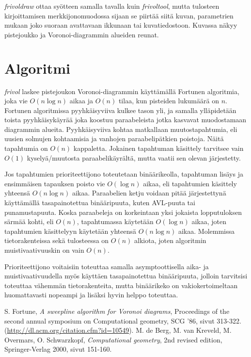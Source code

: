 \documentclass[a4paper, 11pt, finnish]{article}
\begin{document}
\emph{frivoldraw} ottaa syötteen samalla tavalla kuin \emph{frivoltool}, mutta tulosteen kirjoittamisen merkkijonomuodossa sijaan se piirtää siitä kuvan, parametrien mukaan joko suoraan avattavaan ikkunaan tai kuvatiedostoon. Kuvassa näkyy pistejoukko ja Voronoi-diagrammin alueiden reunat.

\section*{Algoritmi}
\emph{frivol} laskee pistejoukon Voronoi-diagrammin käyttämällä Fortunen algoritmia, joka vie $O(n \log n)$ aikaa ja $O(n)$ tilaa, kun pisteiden lukumäärä on $n$. Fortunen algoritmissa pyyhkäisyviiva kulkee tason yli, ja samalla ylläpidetään toista pyyhkäisykäyrää joka koostuu paraabeleista jotka kasvavat muodostamaan diagrammin alueita. Pyyhkäisyviiva kohtaa matkallaan muutostapahtumia, eli uusien solmujen kohtaamisia ja vanhojen paraabelipätkien poistoja. Näitä tapahtumia on $O(n)$ kappaletta. Jokainen tapahtuman käsittely tarvitsee vain $O(1)$ kyselyä/muutosta paraabelikäyrältä, mutta vaatii sen olevan järjestetty.\cite{fortunepaperi}\cite{compgeomkirja}

Jos tapahtumien prioriteettijono toteutetaan binäärikeolla, tapahtuman lisäys ja ensimmäisen tapauksen poisto vie $O(\log n)$ aikaa, eli tapahtumien käsittely yhteensä $O(n \log n)$ aikaa. Paraabelien ketju voidaan pitää järjestettynä käyttämällä tasapainotettua binääripuuta, kuten AVL-puuta tai punamustapuuta. Koska paraabeleja on korkeintaan yksi jokaista lopputuloksen särmää kohti, eli $O(n)$, tapahtumassa käytetään $O(\log n)$ aikaa, joten tapahtumien käsittelyyn käytetään yhteensä $O(n \log n)$ aikaa. Molemmissa tietorakenteissa sekä tulosteessa\cite{fortunepaperi} on $O(n)$ alkiota, joten algoritmin muistivaativuuskin on vain $O(n)$.

Prioriteettijono voitaisiin toteuttaa samalla asymptoottisella aika- ja muistivaativuudella myös käyttäen tasapainotettua binääripuuta, jolloin tarvitsisi toteuttaa vähemmän tietorakenteita, mutta binäärikeko on vakiokertoimeltaan huomattavasti nopeampi ja lisäksi hyvin helppo toteuttaa.

\begin{thebibliography}{9}
 S. Fortune, \emph{A sweepline algorithm for Voronoi diagrams}, Proceedings of the second annual symposium on Computational geometry, SCG '86, sivut 313-322. (\url{http://dl.acm.org/citation.cfm?id=10549}).
 M. de Berg, M. van Kreveld, M. Overmars, O. Schwarzkopf, \emph{Computational geometry}, 2nd revised edition, Springer-Verlag 2000, sivut 151-160.
\end{thebibliography}
\end{document}

